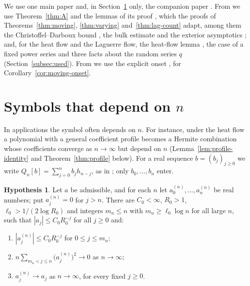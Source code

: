 \documentclass[11pt]{amsart}
\theoremstyle{definition}
\newtheorem{hypothesis}[theorem]{Hypothesis}
\theoremstyle{remark}
\numberwithin{equation}{section}
\begin{document}
We use one main paper \cite{Main} and, in Section~\ref{subsec:moving} only, the companion paper \cite{CompA}. From \cite{Main} we use Theorem~\ref{thm:A} and the lemmas of its proof \cite[Sections~{\ref{M-sec:prelim}}--{\ref{M-sec:proof}}]{Main}, which the proofs of Theorems~\ref{thm:moving}, \ref{thm:varying} and~\ref{thm:lag-count} adapt, among them the Christoffel--Darboux bound \cite[Lemma~\ref{M-lem:cd}]{Main}, the bulk estimate \cite[Proposition~\ref{M-prop:bulk}]{Main} and the exterior asymptotics \cite[Proposition~\ref{M-prop:exterior}]{Main}; and, for the heat flow and the Laguerre flow, the heat-flow lemma \cite[Lemma~\ref{M-lem:heat}]{Main}, the case of a fixed power series \cite[Theorem~\ref{M-thm:fixedq}]{Main} and three facts about the random series $q$ (Section~\ref{subsec:used}). From \cite{CompA} we use the explicit onset \cite[Theorem~\ref{A-thm:quant}]{CompA}, for Corollary~\ref{cor:moving-onset}.

\section{Symbols that depend on \texorpdfstring{$n$}{n}}\label{subsec:moving}

In applications the symbol often depends on $n$. For instance, under the heat flow a polynomial with a general coefficient profile becomes a Hermite combination whose coefficients converge as $n\to\infty$ but depend on $n$ (Lemma~\ref{lem:profile-identity} and Theorem~\ref{thm:profile} below). For a real sequence $b=(b_j)_{j\ge0}$ we write $Q_n[b]=\sum_{j=0}^{n}b_jh_{n-j}$, as in \cite[Definition~\ref{A-def:condition}]{CompA}; only $b_0,\dots,b_n$ enter.

\begin{hypothesis}\label{hyp:N}
Let $a$ be admissible, and for each $n$ let $a^{(n)}_0,\dots,a^{(n)}_n$ be real numbers; put $a^{(n)}_j=0$ for $j>n$. There are $C_0<\infty$, $R_0>1$, $\ell_0>1/(2\log R_0)$ and integers $m_n\le n$ with $m_n\ge\ell_0\log n$ for all large $n$, such that $|a_j|\le C_0R_0^{-j}$ for all $j\ge0$ and:
\begin{enumerate}
\item[(N1)] $|a^{(n)}_j|\le C_0R_0^{-j}$ for $0\le j\le m_n$;
\item[(N2)] $n\sum_{m_n<j\le n}\bigl(a^{(n)}_j\bigr)^2\to0$ as $n\to\infty$;
\item[(N3)] $a^{(n)}_j\to a_j$ as $n\to\infty$, for every fixed $j\ge0$.
\end{enumerate}
\end{hypothesis}
\end{document}
